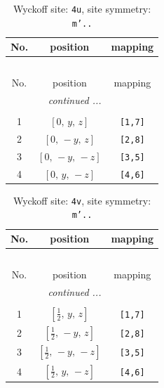 \documentclass[fleqn,8pt]{jsarticle}
\begin{document}
\begin{longtable}{ccc}
\caption{Wyckoff site: {\tt 4u}, site symmetry: {\tt m'..}}
 \\
 \hline \hline
No. & position & mapping \\ \hline \endfirsthead

\multicolumn{2}{l}{\tablename\ \thetable{}} \\
 \hline \hline
No. & position & mapping \\ \hline \endhead

 \hline \hline
\multicolumn{2}{r}{\footnotesize\it continued ...} \\ \endfoot

 \hline \hline
\multicolumn{2}{r}{} \\ \endlastfoot

1 & $\left[ 0,\, y,\, z \right]$ & {\tt [1,7]} \\ \hline
2 & $\left[ 0,\, - y,\, z \right]$ & {\tt [2,8]} \\ \hline
3 & $\left[ 0,\, - y,\, - z \right]$ & {\tt [3,5]} \\ \hline
4 & $\left[ 0,\, y,\, - z \right]$ & {\tt [4,6]} \\
\end{longtable}
\renewcommand{\arraystretch}{1.2}
\begin{longtable}{ccc}
\caption{Wyckoff site: {\tt 4v}, site symmetry: {\tt m'..}}
 \\
 \hline \hline
No. & position & mapping \\ \hline \endfirsthead

\multicolumn{2}{l}{\tablename\ \thetable{}} \\
 \hline \hline
No. & position & mapping \\ \hline \endhead

 \hline \hline
\multicolumn{2}{r}{\footnotesize\it continued ...} \\ \endfoot

 \hline \hline
\multicolumn{2}{r}{} \\ \endlastfoot

1 & $\left[ \frac{1}{2},\, y,\, z \right]$ & {\tt [1,7]} \\ \hline
2 & $\left[ \frac{1}{2},\, - y,\, z \right]$ & {\tt [2,8]} \\ \hline
3 & $\left[ \frac{1}{2},\, - y,\, - z \right]$ & {\tt [3,5]} \\ \hline
4 & $\left[ \frac{1}{2},\, y,\, - z \right]$ & {\tt [4,6]} \\
\end{longtable}
\end{document}
